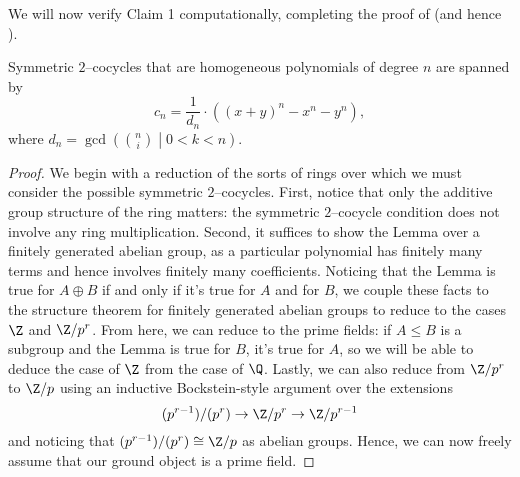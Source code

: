 We will now verify Claim 1 computationally, completing the proof of  (and hence ).

\begin{lemma}\label{Symmetric2CocycleLemma}
Symmetric $2$--cocycles that are homogeneous polynomials of degree $n$ are spanned by \[c_n = \frac{1}{d_n} \cdot ((x + y)^n - x^n - y^n),\] where $d_n = \gcd\left( \binom{n}{i} \middle| 0 < k < n \right)$.
\end{lemma}
\begin{proof}
We begin with a reduction of the sorts of rings over which we must consider the possible symmetric $2$--cocycles.  First, notice that only the additive group structure of the ring matters: the symmetric $2$--cocycle condition does not involve any ring multiplication.  Second, it suffices to show the Lemma over a finitely generated abelian group, as a particular polynomial has finitely many terms and hence involves finitely many coefficients.  Noticing that the Lemma is true for $A \oplus B$ if and only if it's true for $A$ and for $B$, we couple these facts to the structure theorem for finitely generated abelian groups to reduce to the cases $\Z$ and $\Z/p^r$.  From here, we can reduce to the prime fields: if $A \le B$ is a subgroup and the Lemma is true for $B$, it's true for $A$, so we will be able to deduce the case of $\Z$ from the case of $\Q$.  Lastly, we can also reduce from $\Z/p^r$ to $\Z/p$ using an inductive Bockstein-style argument over the extensions \[(p^{r-1}) / (p^r) \to \Z/p^r \to \Z/p^{r-1}\] and noticing that $(p^{r-1}) / (p^r) \cong \Z/p$ as abelian groups.  Hence, we can now freely assume that our ground object is a prime field.


\end{proof}
